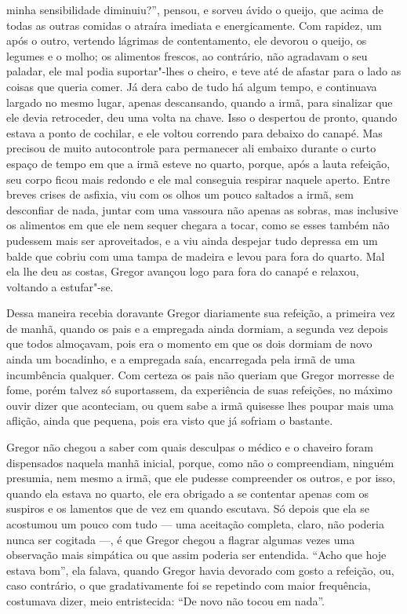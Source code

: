 minha sensibilidade diminuiu?”, pensou, e sorveu ávido o queijo, que acima
de todas as outras comidas o atraíra imediata e energicamente. Com
rapidez, um após o outro, vertendo lágrimas de contentamento, ele devorou
o queijo, os legumes e o molho; os alimentos frescos, ao contrário, não
agradavam o seu paladar, ele mal podia suportar"-lhes o cheiro, e teve até
de afastar para o lado as coisas que queria comer. Já dera cabo de tudo há
algum tempo, e continuava largado no mesmo lugar, apenas descansando,
quando a irmã, para sinalizar que ele devia retroceder, deu uma volta na
chave. Isso o despertou de pronto, quando estava a ponto de cochilar, e
ele voltou correndo para debaixo do canapé. Mas precisou de muito
autocontrole para permanecer ali embaixo durante o curto espaço de tempo
em que a irmã esteve no quarto, porque, após a lauta refeição, seu corpo
ficou mais redondo e ele mal conseguia respirar naquele aperto. Entre
breves crises de asfixia, viu com os olhos um pouco saltados a irmã, sem
desconfiar de nada, juntar com uma vassoura não apenas as sobras, mas
inclusive os alimentos em que ele nem sequer chegara a tocar, como se
esses também não pudessem mais ser aproveitados, e a viu ainda despejar
tudo depressa em um balde que cobriu com uma tampa de madeira e levou para
fora do quarto. Mal ela lhe deu as costas, Gregor avançou logo para fora
do canapé e relaxou, voltando a estufar"-se.

Dessa maneira recebia doravante Gregor diariamente sua refeição, a
primeira vez de manhã, quando os pais e a empregada ainda dormiam, a
segunda vez depois que todos almoçavam, pois era o momento em que os dois
dormiam de novo ainda um bocadinho, e a empregada saía, encarregada pela
irmã de uma incumbência qualquer. Com certeza os pais não queriam que
Gregor morresse de fome, porém talvez só suportassem, da experiência de
suas refeições, no máximo ouvir dizer que aconteciam, ou quem sabe a irmã
quisesse lhes poupar mais uma aflição, ainda que pequena, pois era visto
que já sofriam o bastante.

Gregor não chegou a saber com quais desculpas o médico e o chaveiro foram
dispensados naquela manhã inicial, porque, como não o compreendiam,
ninguém presumia, nem mesmo a irmã, que ele pudesse compreender os outros,
e por isso, quando ela estava no quarto, ele era obrigado a se contentar
apenas com os suspiros e os lamentos que de vez em quando escutava. Só
depois que ela se acostumou um pouco com tudo --- uma aceitação completa,
claro, não poderia nunca ser cogitada ---, é que Gregor chegou a flagrar
algumas vezes uma observação mais simpática ou que assim poderia ser
entendida. “Acho que hoje estava bom”, ela falava, quando Gregor havia
devorado com gosto a refeição, ou, caso contrário, o que gradativamente
foi se repetindo com maior frequência, costumava dizer, meio entristecida:
“De novo não tocou em nada”.

